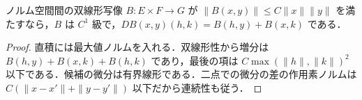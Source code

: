 \begin{example}[連続双線形写像の微分]
ノルム空間間の双線形写像 $B:E\times F\to G$ が $\|B(x,y)\|\leq C\|x\|\|y\|$ を満たすなら，$B$ は $C^1$ 級で，$DB(x,y)(h,k)=B(h,y)+B(x,k)$ である．
\end{example}
\begin{proof}
直積には最大値ノルムを入れる．双線形性から増分は $B(h,y)+B(x,k)+B(h,k)$ であり，最後の項は $C\max(\|h\|,\|k\|)^2$ 以下である．候補の微分は有界線形である．二点での微分の差の作用素ノルムは $C(\|x-x'\|+\|y-y'\|)$ 以下だから連続性も従う．
\end{proof}
